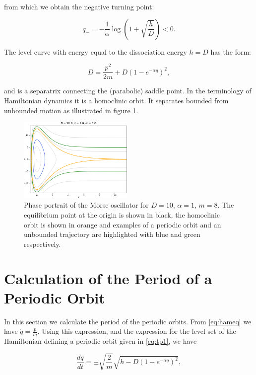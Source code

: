 \documentclass{ws-ijbc}
\begin{document}
\noindent
from which we obtain the negative turning point:

\begin{equation}
q_- = - \frac{1}{\alpha} \log \left(1 + \sqrt{\frac{h}{D}}  \right) < 0.
\label{eq:tpneg}
\end{equation}

The  level curve with energy equal to the dissociation energy $h=D$ has the form:

\begin{equation}
D= \frac{p^2}{2m} + D \left( 1-e^{-\alpha q} \right)^2,
\label{eq:homo1}
\end{equation}

\noindent
and is a separatrix connecting the (parabolic) saddle point. In the terminology of Hamiltonian dynamics it is a homoclinic orbit. It separates bounded from unbounded motion as illustrated in figure \ref{fig:phase}.

\begin{figure}
 \centering
 \includegraphics[width=0.49\textwidth]{phase}
 \caption{Phase portrait of the Morse oscillator for $D=10$, $\alpha=1$, $m=8$. The equilibrium point at the origin is shown in black, the homoclinic orbit is shown in orange and examples of a periodic orbit and an unbounded trajectory are highlighted with blue and green respectively.}
 \label{fig:phase}
\end{figure}


\section{Calculation of the Period of a Periodic Orbit}
\label{sec:period}

In this section we calculate the period of the periodic orbits. 
From \eqref{eq:hameq} we have $\dot{q} = \frac{p}{m}$. Using this expression, and the expression for the level set of the Hamiltonian defining a periodic orbit given in \eqref{eq:tp1}, we have


\begin{equation}
\frac{dq}{dt} = \pm \sqrt{\frac{2}{m}} \sqrt{h-D \left( 1-e^{-\alpha q} \right)^2},
\label{eq:po1}
\end{equation}
\end{document}

